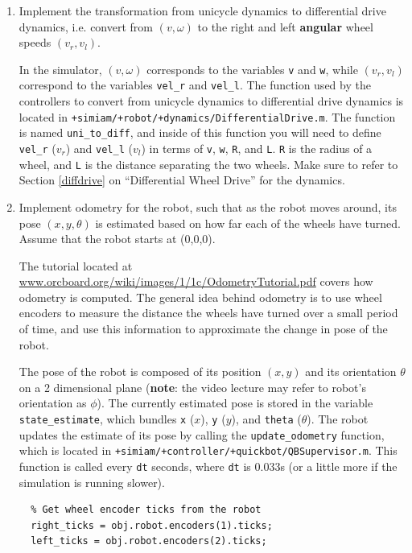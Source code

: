 \documentclass[10pt]{article}
\begin{document}
\begin{enumerate}
 \item Implement the transformation from unicycle dynamics to differential drive dynamics, i.e. convert from $(v,\omega)$ to the right and left \textbf{angular} wheel speeds $(v_r,v_l)$.
 
 In the simulator, $(v,\omega)$ corresponds to the variables \texttt{v} and \texttt{w}, while $(v_r,v_l)$ correspond to the variables \texttt{vel\_r} and \texttt{vel\_l}. The function used by the controllers to convert from unicycle dynamics to differential drive dynamics is located in \texttt{+simiam/+robot/+dynamics/DifferentialDrive.m}. The function is named \texttt{uni\_to\_diff}, and inside of this function you will need to define \texttt{vel\_r} ($v_r$) and \texttt{vel\_l} ($v_l$) in terms of \texttt{v}, \texttt{w}, \texttt{R}, and \texttt{L}. \texttt{R} is the radius of a wheel, and \texttt{L} is the distance separating the two wheels. Make sure to refer to Section \ref{diffdrive} on ``Differential Wheel Drive'' for the dynamics.
 
 \item Implement odometry for the robot, such that as the robot moves around, its pose $(x,y,\theta)$ is estimated based on how far each of the wheels have turned. Assume that the robot starts at (0,0,0).
 
 The tutorial located at \url{www.orcboard.org/wiki/images/1/1c/OdometryTutorial.pdf} covers how odometry is computed. The general idea behind odometry is to use wheel encoders to measure the distance the wheels have turned over a small period of time, and use this information to approximate the change in pose of the robot.

 The pose of the robot is composed of its position $(x,y)$ and its orientation $\theta$ on a 2 dimensional plane (\textbf{note}: the video lecture may refer to robot's orientation as $\phi$). The currently estimated pose is stored in the variable \texttt{state\_estimate}, which bundles \texttt{x} ($x$), \texttt{y} ($y$), and \texttt{theta} ($\theta$). The robot updates the estimate of its pose by calling the \texttt{update\_odometry} function, which is located in \texttt{+simiam/+controller/+quickbot/QBSupervisor.m}. This function is called every \texttt{dt} seconds, where \texttt{dt} is $0.033$s (or a little more if the simulation is running slower).
 \begin{verbatim}  
  % Get wheel encoder ticks from the robot
  right_ticks = obj.robot.encoders(1).ticks;
  left_ticks = obj.robot.encoders(2).ticks;


\end{verbatim}
\end{enumerate}
\end{document}
